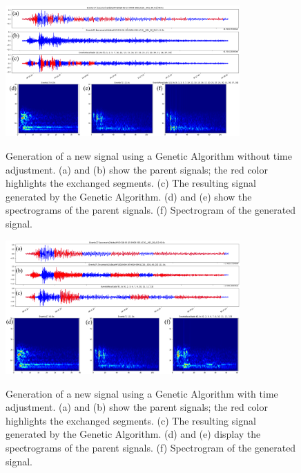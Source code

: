 \documentclass[journal]{IEEEtran}
\begin{document}
\begin{figure}
\centering
{\includegraphics[width=0.8\textwidth,keepaspectratio]{img/da_ag1.png}}
\caption{Generation of a new signal using a Genetic Algorithm without time adjustment. (a) and (b) show the parent signals; the red color highlights the exchanged segments. (c) The resulting signal generated by the Genetic Algorithm. (d) and (e) show the spectrograms of the parent signals. (f) Spectrogram of the generated signal.}
\label{fig:da_ga1}
\end{figure}
\begin{figure}
\centering
{\includegraphics[width=0.8\textwidth,keepaspectratio]{img/da_ag2.png}}
\caption{Generation of a new signal using a Genetic Algorithm with time adjustment. (a) and (b) show the parent signals; the red color highlights the exchanged segments. (c) The resulting signal generated by the Genetic Algorithm. (d) and (e) display the spectrograms of the parent signals. (f) Spectrogram of the generated signal.}
\label{fig:da_ga2}
\end{figure}
\end{document}
